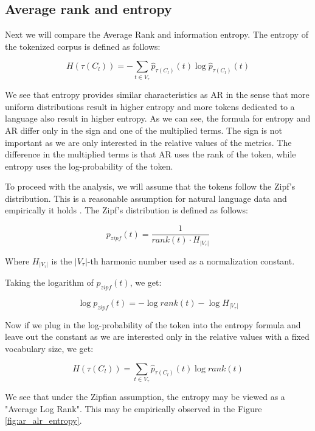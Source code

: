 \subsection{Average rank and entropy}

Next we will compare the Average Rank and information entropy. The entropy of the tokenized corpus is defined as follows:

\begin{equation}
    H(\tau(C_l)) = - \sum_{t \in V_\tau} \hat{p}_{\tau(C_l)}(t) \log \hat{p}_{\tau(C_l)}(t)
\end{equation}

We see that entropy provides similar characteristics as AR in the sense that more uniform distributions result in higher entropy and more tokens dedicated to a language also result in higher entropy. As we can see, the formula for entropy and AR differ only in the sign and one of the multiplied terms. The sign is not important as we are only interested in the relative values of the metrics. The difference in the multiplied terms is that AR uses the rank of the token, while entropy uses the log-probability of the token. 

To proceed with the analysis, we will assume that the tokens follow the Zipf's distribution. This is a reasonable assumption for natural language data and empirically it holds . The Zipf's distribution is defined as follows:

\begin{equation}
    p_{zipf}(t) = \frac{1}{rank(t) \cdot H_{|V_\tau|}}
\end{equation}

Where $H_{|V_\tau|}$ is the $|V_\tau|$-th harmonic number used as a normalization constant.

Taking the logarithm of $p_{zipf}(t)$, we get:

\begin{equation}
    \log p_{zipf}(t) = - \log rank(t) - \log H_{|V_\tau|}
\end{equation}

Now if we plug in the log-probability of the token into the entropy formula and leave out the constant as we are interested only in the relative values with a fixed vocabulary size, we get:

\begin{equation}
    H(\tau(C_l)) = \sum_{t \in V_\tau} \hat{p}_{\tau(C_l)}(t) \log rank(t)
\end{equation}

We see that under the Zipfian assumption, the entropy may be viewed as a "Average Log Rank". This may be empirically observed in the Figure \ref{fig:ar_alr_entropy}.

